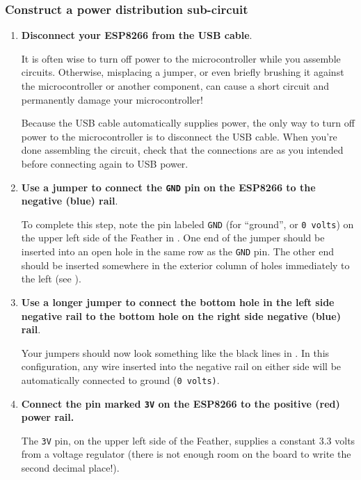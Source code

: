 \subsubsection{\howto Construct a power distribution sub-circuit}
\begin{enumerate}
	\item \textbf{Disconnect your ESP8266 from the USB cable}.
	
	It is often wise to turn off power to the microcontroller while you assemble circuits. 
	Otherwise, misplacing a jumper, or even briefly brushing it against the microcontroller or another component, can cause a short circuit and permanently damage your microcontroller! 
 	
 	Because the USB cable automatically supplies power, the only way to turn off power to the microcontroller is to disconnect the USB cable.
	When you're done assembling the circuit, check that the connections are as you intended before connecting again to USB power.  
	
	\item \textbf{Use a jumper to connect the \texttt{GND} pin on the ESP8266 to the negative (blue) rail}.
	
	To complete this step, note the pin labeled \texttt{GND} (for ``ground'', or \texttt{0 volts}) on the upper left side of the Feather in . 
	One end of the jumper should be inserted into an open hole in the same row as the \texttt{GND} pin. 
	The other end should be inserted somewhere in the exterior column of holes immediately to the left (see ).
	
	\item \textbf{Use a longer jumper to connect the bottom hole in the left side negative rail to the bottom hole on the right side negative (blue) rail}. 
	
	Your jumpers should now look something like the black lines in . 
	In this configuration, any wire inserted into the negative rail on either side will be automatically connected to ground (\texttt{0 volts)}.
	
	\item \textbf{Connect the pin marked \texttt{3V} on the ESP8266 to the positive (red) power rail.}
	
	The \texttt{3V} pin, on the upper left side of the Feather, supplies a constant 3.3 volts from a voltage regulator (there is not enough room on the board to write the second decimal place!).	
	

\end{enumerate}
